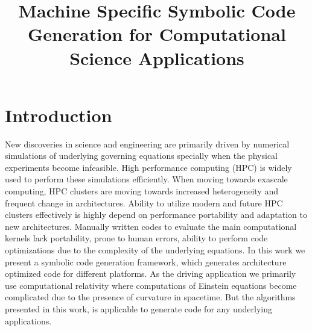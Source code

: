 \documentclass[10pt, conference]{IEEEtran} %
\begin{document}
%
\title{Machine Specific Symbolic Code Generation for Computational Science Applications}



\author{
}


\maketitle

\IEEEpeerreviewmaketitle

\section{Introduction}
New discoveries in science and engineering are primarily driven by numerical simulations of underlying governing equations specially when the physical experiments become infeasible. High performance computing (HPC) is widely used to perform these simulations efficiently. When moving towards exascale computing, HPC clusters are moving towards increased heterogeneity and frequent change in architectures. Ability to utilize modern and future HPC clusters effectively is highly depend on performance portability and adaptation to new architectures. Manually written codes to evaluate the main computational kernels lack portability, prone to human errors, ability to perform code optimizations due to the complexity of the underlying equations. In this work we present a symbolic code generation framework, which generates architecture optimized code for different platforms. As the driving application we primarily use computational relativity where computations of Einstein equations become complicated due to the presence of curvature in spacetime. But the algorithms presented in this work, is applicable to generate code for any underlying applications.
\end{document}
